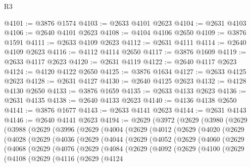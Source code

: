 \begin{lexlean}{R3}
\begin{coremodule}
@4101 := @3876 @1574
@4103 := @2633 @4101 @2623
@4104 := @2631 @4103
@4106 := @2640 @4101 @2623
@4108 := @4104 @4106 @2650
@4109 := @3876 @1591
@4111 := @2633 @4109 @2623
@4112 := @2631 @4111
@4114 := @2640 @4109 @2623
@4116 := @4112 @4114 @2650
@4117 := @3876 @1609
@4119 := @2633 @4117 @2623
@4120 := @2631 @4119
@4122 := @2640 @4117 @2623
@4124 := @4120 @4122 @2650
@4125 := @3876 @1634
@4127 := @2633 @4125 @2623
@4128 := @2631 @4127
@4130 := @2640 @4125 @2623
@4132 := @4128 @4130 @2650
@4133 := @3876 @1659
@4135 := @2633 @4133 @2623
@4136 := @2631 @4135
@4138 := @2640 @4133 @2623
@4140 := @4136 @4138 @2650
@4141 := @3876 @1677
@4143 := @2633 @4141 @2623
@4144 := @2631 @4143
@4146 := @2640 @4141 @2623
@4194 := @2629
    (@3972
      (@2629
        (@3980
          (@2629
            (@3988
              (@2629
                (@3996
                  (@2629
                    (@4004
                      (@2629
                        (@4012
                          (@2629
                            (@4020
                              (@2629
                                (@4028
                                  (@2629
                                    (@4036
                                      (@2629
                                        (@4044
                                          (@2629
                                            (@4052
                                              (@2629
                                                (@4060
                                                  (@2629
                                                    (@4068
                                                      (@2629
                                                        (@4076
                                                          (@2629
                                                            (@4084
                                                              (@2629
                                                                (@4092
                                                                  (@2629
                                                                    (@4100
                                                                      (@2629
                                                                        (@4108
                                                                          (@2629
                                                                            (@4116
                                                                              (@2629
                                                                                (@4124

\end{coremodule}
\end{lexlean}
